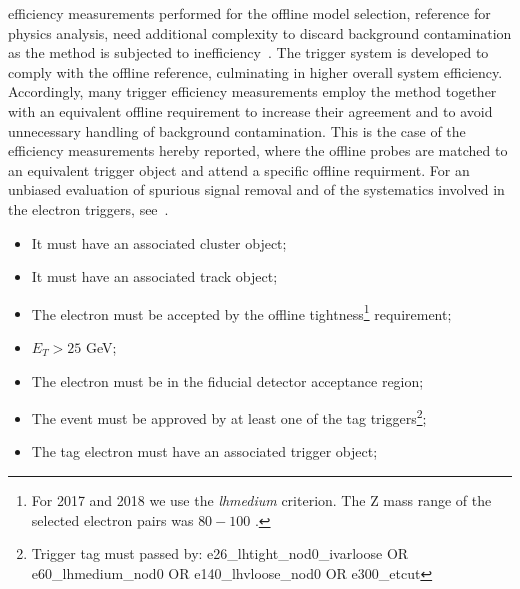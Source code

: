 
\TnP{} efficiency measurements performed for the offline model selection,
reference for physics analysis, need additional complexity to discard background 
contamination as the method is subjected to
inefficiency~\cite{aaboud2019electron}. The trigger system is developed to
comply with the offline reference, culminating in higher overall system
efficiency. Accordingly, many trigger efficiency measurements employ the \tnp
method together with an equivalent offline requirement to increase
their agreement and to avoid unnecessary handling of background contamination.
This is the case of the efficiency measurements hereby reported, where the
offline probes are matched to an equivalent trigger object and attend a specific
offline requirment. For an unbiased evaluation of spurious signal removal and
of the systematics involved in the electron triggers, see~\cite{aad2020performance}. 




\begin{itemize}

  \item It must have an associated cluster object;
  \item It must have an associated track object;
  \item The electron must be accepted by the offline tightness\footnote{For 2017 and 2018 we use the \textit{lhmedium} criterion. The Z mass range of the selected electron pairs was $80-100$ \GeV.} requirement;
  \item $E_{T} > 25$ GeV;
  \item The electron must be in the fiducial detector acceptance region;
  \item The event must be approved by at least one of the tag triggers\footnote{Trigger tag must passed by:
  e26\_lhtight\_nod0\_ivarloose OR e60\_lhmedium\_nod0 OR e140\_lhvloose\_nod0 OR e300\_etcut};
  \item The tag electron must have an associated trigger object;  

\end{itemize}

